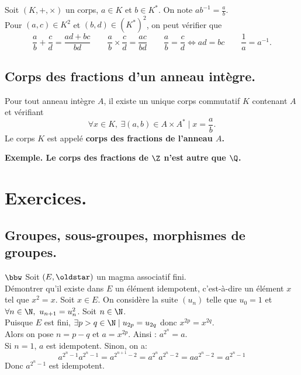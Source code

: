 \documentclass[11pt]{article}
\begin{document}
Soit $(K,+,\times)$ un corps, $a\in K$ et $b\in K^*$. On note $ab^{-1}=\frac{a}{b}$.\\
Pour $(a,c)\in K^2$ et $(b,d)\in(K^*)^2$, on peut vérifier que
\begin{equation*}
    \frac{a}{b}+\frac{c}{d}=\frac{ad+bc}{bd} \qquad \frac{a}{b}\times\frac{c}{d}=\frac{ac}{bd} \qquad \frac{a}{b}=\frac{c}{d}\iff ad = bc \qquad \frac{1}{a}=a^{-1}.
\end{equation*}

\subsection{Corps des fractions d'un anneau intègre.}

\begin{thm}{}{}
    Pour tout anneau intègre $A$, il existe un unique corps commutatif $K$ contenant $A$ et vérifiant
    \begin{equation*}
        \forall x \in K, ~ \exists (a,b) \in A\times A^* \mid x = \frac{a}{b}. 
    \end{equation*}
    Le corps $K$ est appelé \bf{corps des fractions} de l'anneau $A$.
\end{thm}

\bf{Exemple.} Le corps des fractions de $\Z$ n'est autre que $\Q$.

\section{Exercices.}

\subsection*{Groupes, sous-groupes, morphismes de groupes.}

\begin{exercice}{$\bbw$}{}
    Soit $(E,\s)$ un magma associatif fini.\\
    Démontrer qu'il existe dans $E$ un élément idempotent, c'est-à-dire un élément $x$ tel que $x^2=x$.
    \tcblower
    Soit $x\in E$. On considère la suite $(u_n)$ telle que $u_0=1$ et $\forall n \in \N, ~ u_{n+1}=u_n^2$. Soit $n\in\N$.\\
    Puisque $E$ est fini, $\exists p>q \in \N \mid u_{2p}=u_{2q}$ donc $x^{2p}=x^{2q}$.\\
    Alors on pose $n=p-q$ et $a=x^{2p}$. Ainsi : $a^{2^n}=a$.\\
    Si $n=1$, $a$ est idempotent. Sinon, on a:
    \begin{equation*}
        a^{2^{n}-1}a^{2^{n}-1}=a^{2^{n+1}-2}=a^{2^n}a^{2^n-2}=aa^{2^n-2}=a^{2^n-1}
    \end{equation*}
    Donc $a^{2^n-1}$ est idempotent.
\end{exercice}
\end{document}
